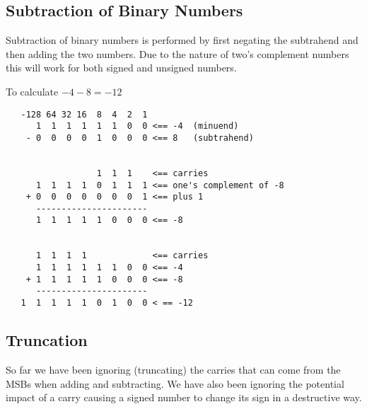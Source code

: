 \subsection{Subtraction of Binary Numbers}


Subtraction of binary numbers is performed by first negating
the subtrahend and then adding the two numbers.  Due to the
nature of two's complement numbers this will work for both 
signed and unsigned numbers.

To calculate $-4-8 = -12$


\begin{verbatim}
   -128 64 32 16  8  4  2  1
      1  1  1  1  1  1  0  0 <== -4  (minuend)
    - 0  0  0  0  1  0  0  0 <== 8   (subtrahend)


                  1  1  1    <== carries
      1  1  1  1  0  1  1  1 <== one's complement of -8
    + 0  0  0  0  0  0  0  1 <== plus 1
      ----------------------
      1  1  1  1  1  0  0  0 <== -8
      
	  
      1  1  1  1             <== carries
      1  1  1  1  1  1  0  0 <== -4
    + 1  1  1  1  1  0  0  0 <== -8
      ----------------------
   1  1  1  1  1  0  1  0  0 < == -12
\end{verbatim}


\subsection{Truncation}

So far we have been ignoring (truncating) the carries that can come from 
the MSBs when adding and subtracting.  We have also been ignoring the 
potential impact of a carry causing a signed number to change its sign in
a destructive way.

